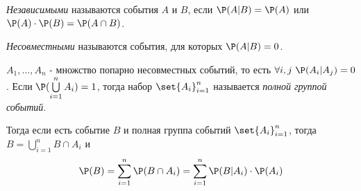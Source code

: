 \begin{definition}
    \textit{Независимыми} называются события $A$ и $B$, если $\P(A \vert B) = \P(A)$ или $\P(A) \cdot \P(B) = \P(A \cap B)$. \par
    \textit{Несовместными} называются события, для которых $\P(A \vert B) = 0$.
\end{definition}

\begin{definition}
    $A_1, \ldots, A_n$ - множство попарно несовместных событий, то есть $\forall i, j \ \P(A_i \vert A_j) = 0$. Если $\P(\bigcup \limits_{i = 1}^{n} A_i) = 1$, тогда набор $\set{A_i}_{i = 1}^{n}$ называется \textit{полной группой событий}.
\end{definition}

Тогда если есть событие $B$ и полная группа событий $\set{A_i}_{i = 1}^{n}$, тогда $B = \bigcup \limits_{i = 1}^{n} B \cap A_i$ и
\[
    \P(B) = \sum \limits_{i = 1}^{n} \P(B \cap A_i) = \sum \limits_{i = 1}^{n} \P(B \vert A_i) \cdot \P(A_i) 
\]